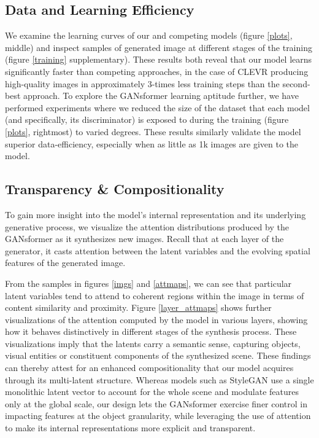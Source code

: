 \documentclass{article}
\begin{document}
\subsection{Data and Learning Efficiency}
\label{data} 
We examine the learning curves of our and competing models (figure \ref{plots}, middle) and inspect samples of generated image at different stages of the training (figure \ref{training} supplementary). These results both reveal that our model learns significantly faster than competing approaches, in the case of CLEVR producing high-quality images in approximately 3-times less training steps than the second-best approach. To explore the GANsformer learning aptitude further, we have performed experiments where we reduced the size of the dataset that each model (and specifically, its discriminator) is exposed to during the training (figure \ref{plots}, rightmost) to varied degrees. These results similarly validate the model superior data-efficiency, especially when as little as 1k images are given to the model.  





\subsection{Transparency \& Compositionality} \label{comp} 
To gain more insight into the model's internal representation and its underlying generative process, we visualize the attention distributions produced by the GANsformer as it synthesizes new images. Recall that at each layer of the generator, it casts attention between the  latent variables and the evolving spatial features of the generated image. 

From the samples in figures \ref{imgs} and \ref{attmaps}, we can see that particular latent variables tend to attend to coherent regions within the image in terms of content similarity and proximity. Figure \ref{layer_attmaps} shows further visualizations of the attention computed by the model in various layers, showing how it behaves distinctively in different stages of the synthesis process. These visualizations imply that the latents carry a semantic sense, capturing objects, visual entities or constituent components of the synthesized scene. These findings can thereby attest for an enhanced compositionality that our model acquires through its multi-latent structure. Whereas models such as StyleGAN use a single monolithic latent vector to account for the whole scene and modulate features only at the global scale, our design lets the GANsformer exercise finer control in impacting features at the object granularity, while leveraging the use of attention to make its internal representations more explicit and transparent.  
\end{document}

